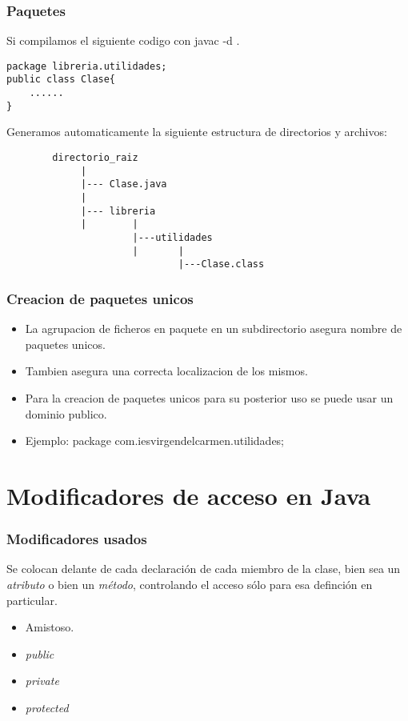 \documentclass{beamer}
\begin{document}
\begin{frame}[fragile]
\frametitle{Paquetes}
Si compilamos el siguiente codigo con \alert{javac -d .}
\begin{verbatim}
package libreria.utilidades;
public class Clase{
    ......
}
\end{verbatim}
\pause 
Generamos automaticamente la siguiente estructura de directorios y archivos:
\pause
\begin{verbatim}
        directorio_raiz
             |
             |--- Clase.java
             |
             |--- libreria
             |        |
                      |---utilidades
                      |       |
                              |---Clase.class
\end{verbatim}

\end{frame}






\begin{frame}
    \frametitle{Creacion de paquetes unicos}
\begin{footnotesize}
\begin{itemize}[<+->]
\item La agrupacion de ficheros en paquete en un subdirectorio asegura nombre de paquetes unicos.
\item Tambien asegura una correcta localizacion de los mismos.
\item Para la creacion de paquetes unicos para su posterior uso se puede usar un dominio publico.
\item Ejemplo: package com.iesvirgendelcarmen.utilidades;
\end{itemize}
\end{footnotesize}
\pause
\end{frame}

\section{Modificadores de acceso en Java}
\begin{frame}
\frametitle{Modificadores usados}
Se colocan delante de cada declaración de cada miembro de la clase, bien sea un \emph{atributo} o bien un \emph{método}, controlando el acceso sólo para esa definción en particular.
\begin{itemize}[<+-|alert@+>]
\item Amistoso.
\item \emph{public}
\item \emph{private}
\item \emph{protected}
\end{itemize}
\pause
\end{frame}
\end{document}
